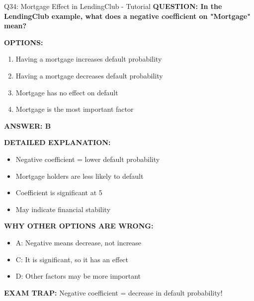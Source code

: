 \documentclass[8pt]{beamer}
\begin{document}
	\begin{frame}{Q34: Mortgage Effect in LendingClub - Tutorial}
		\fontsize{6.5}{7.5}\selectfont
		\textbf{QUESTION: In the LendingClub example, what does a negative coefficient on "Mortgage" mean?}
		
		\vspace{0.1cm}
		\textbf{OPTIONS:}
		\begin{enumerate}
			\item Having a mortgage increases default probability
			\item Having a mortgage decreases default probability
			\item Mortgage has no effect on default
			\item Mortgage is the most important factor
		\end{enumerate}
		
		\vspace{0.1cm}
		\textcolor{myblue}{\textbf{ANSWER: B}}
		
		\vspace{0.1cm}
		\textbf{DETAILED EXPLANATION:}
		\begin{itemize}
			\item Negative coefficient = lower default probability
			\item Mortgage holders are less likely to default
			\item Coefficient is significant at 5%
			\item May indicate financial stability
		\end{itemize}
		
		\vspace{0.1cm}
		\textcolor{myred}{\textbf{WHY OTHER OPTIONS ARE WRONG:}}
		\begin{itemize}
			\item \textcolor{myred}{A:} Negative means decrease, not increase
			\item \textcolor{myred}{C:} It is significant, so it has an effect
			\item \textcolor{myred}{D:} Other factors may be more important
		\end{itemize}
		
		\textcolor{myred}{\textbf{EXAM TRAP:}} Negative coefficient = \textcolor{myblue}{decrease in default probability}!
	\end{frame}
	
\end{document}
